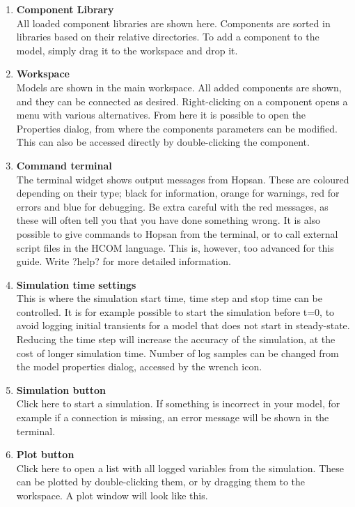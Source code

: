 \documentclass[a4paper]{article}
\begin{document}
\begin{enumerate}
\item \textbf{Component Library}\\
All loaded component libraries are shown here. Components are sorted in libraries based on their relative directories. To add a component to the model, simply drag it to the workspace and drop it.

\item \textbf{Workspace}\\
Models are shown in the main workspace. All added components are shown, and they can be connected as desired. Right-clicking on a component opens a menu with various alternatives. From here it is possible to open the Properties dialog, from where the components parameters can be modified. This can also be accessed directly by double-clicking the component. 

\item \textbf{Command terminal} \\
The terminal widget shows output messages from Hopsan. These are coloured depending on their type; black for information, orange for warnings, red for errors and blue for debugging. Be extra careful with the red messages, as these will often tell you that you have done something wrong. It is also possible to give commands to Hopsan from the terminal, or to call external script files in the HCOM language. This is, however, too advanced for this guide. Write ?help? for more detailed information. 

\item \textbf{Simulation time settings} \\
This is where the simulation start time, time step and stop time can be controlled. It is for example possible to start the simulation before t=0, to avoid logging initial transients for a model that does not start in steady-state. Reducing the time step will increase the accuracy of the simulation, at the cost of longer simulation time. Number of log samples can be changed from the model properties dialog, accessed by the wrench icon.

\item \textbf{Simulation button} \\
Click here to start a simulation. If something is incorrect in your model, for example if a connection is missing, an error message will be shown in the terminal.

\item \textbf{Plot button} \\
Click here to open a list with all logged variables from the simulation. These can be plotted by double-clicking them, or by dragging them to the workspace. A plot window will look like this.


\end{enumerate}
\end{document}
